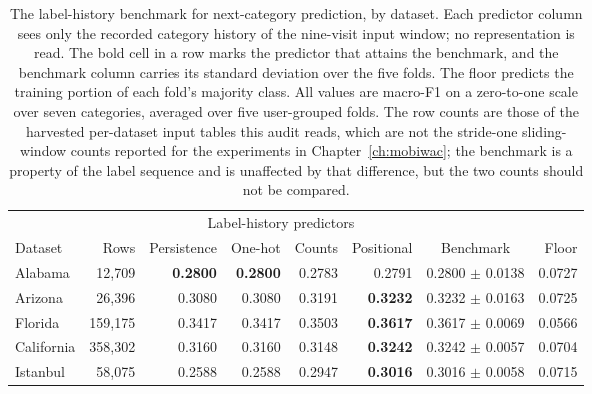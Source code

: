 \begin{table}[htbp]
\caption{The label-history benchmark for next-category prediction, by dataset. Each predictor
column sees only the recorded category history of the nine-visit input window; no representation is
read. The bold cell in a row marks the predictor that attains the benchmark, and the benchmark
column carries its standard deviation over the five folds. The floor predicts the training portion
of each fold's majority class. All values are macro-F1 on a zero-to-one scale over seven
categories, averaged over five user-grouped folds. The row counts are those of the harvested
per-dataset input tables this audit reads, which are not the stride-one sliding-window counts
reported for the experiments in Chapter~\ref{ch:mobiwac}; the benchmark is a property of the label
sequence and is unaffected by that difference, but the two counts should not be compared.}
\label{tab:apx:ceiling}
\centering
\footnotesize
\begin{tabular}{lrrrrrcr}
\toprule
 & & \multicolumn{4}{c}{Label-history predictors} & & \\
\cmidrule(lr){3-6}
Dataset & Rows & Persistence & One-hot & Counts & Positional & Benchmark & Floor \\
\midrule
Alabama & 12,709 & \textbf{0.2800} & \textbf{0.2800} & 0.2783 & 0.2791 & 0.2800 $\pm$ 0.0138 & 0.0727 \\
Arizona & 26,396 & 0.3080 & 0.3080 & 0.3191 & \textbf{0.3232} & 0.3232 $\pm$ 0.0163 & 0.0725 \\
Florida & 159,175 & 0.3417 & 0.3417 & 0.3503 & \textbf{0.3617} & 0.3617 $\pm$ 0.0069 & 0.0566 \\
California & 358,302 & 0.3160 & 0.3160 & 0.3148 & \textbf{0.3242} & 0.3242 $\pm$ 0.0057 & 0.0704 \\
Istanbul & 58,075 & 0.2588 & 0.2588 & 0.2947 & \textbf{0.3016} & 0.3016 $\pm$ 0.0058 & 0.0715 \\
\bottomrule
\end{tabular}
\end{table}
